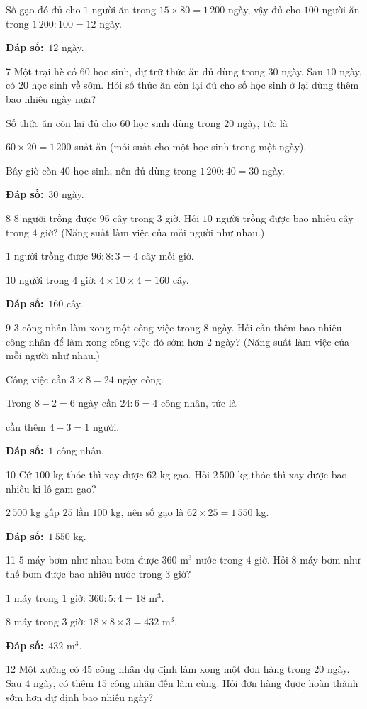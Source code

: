\documentclass[11pt]{article}
\newif\ifsol \solfalse
\providecommand{\AnsWord}{Đáp số}
\newcommand{\dapso}[1]{\par\textbf{\AnsWord:}\ #1}
\newcommand{\probsol}[1]{%
  \begin{lrbox}{\solmeasure}\begin{minipage}{\dimexpr\linewidth-24pt\relax}#1\end{minipage}\end{lrbox}%
  \ifsol
    \begin{solbox}#1\end{solbox}%
  \else
    \setlength{\solht}{\dimexpr\ht\solmeasure+\dp\solmeasure+0.85cm\relax}%
    \ifdim\solht<1.35cm\setlength{\solht}{1.35cm}\fi
    \begin{tcolorbox}[colback=white,colframe=Line,boxrule=0.8pt,arc=5pt,
      left=8pt,right=8pt,top=4pt,bottom=4pt,height=\solht]{\footnotesize\color{Slate}\itshape\WorkWord}\end{tcolorbox}%
  \fi}
\newcommand{\gap}{\vspace{0.3cm}}
\def\WorkWord{Bài làm:}
\def\AnsWord{Đáp số}
\begin{document}
\probsol{
Số gạo đó đủ cho $1$ người ăn trong $15\times80=1\,200$ ngày, vậy đủ cho $100$ người ăn trong $1\,200:100=12$ ngày.
\dapso{$12$ ngày.}}
\gap
\begin{probbox}{7}{\relax}
Một trại hè có $60$ học sinh, dự trữ thức ăn đủ dùng trong $30$ ngày. Sau $10$ ngày, có $20$ học sinh về sớm. Hỏi số thức ăn còn lại đủ cho số học sinh ở lại dùng thêm bao nhiêu ngày nữa?
\end{probbox}
\probsol{
Số thức ăn còn lại đủ cho $60$ học sinh dùng trong $20$ ngày, tức là\par $60\times20=1\,200$ suất ăn (mỗi suất cho một học sinh trong một ngày).\par Bây giờ còn $40$ học sinh, nên đủ dùng trong $1\,200:40=30$ ngày.
\dapso{$30$ ngày.}}
\gap
\begin{probbox}{8}{\relax}
$8$ người trồng được $96$ cây trong $3$ giờ. Hỏi $10$ người trồng được bao nhiêu cây trong $4$ giờ? (Năng suất làm việc của mỗi người như nhau.)
\end{probbox}
\probsol{
$1$ người trồng được $96:8:3=4$ cây mỗi giờ.\par $10$ người trong $4$ giờ: $4\times10\times4=160$ cây.
\dapso{$160$ cây.}}
\gap
\begin{probbox}{9}{\relax}
$3$ công nhân làm xong một công việc trong $8$ ngày. Hỏi cần thêm bao nhiêu công nhân để làm xong công việc đó sớm hơn $2$ ngày? (Năng suất làm việc của mỗi người như nhau.)
\end{probbox}
\probsol{
Công việc cần $3\times8=24$ ngày công.\par Trong $8-2=6$ ngày cần $24:6=4$ công nhân, tức là\par cần thêm $4-3=1$ người.
\dapso{$1$ công nhân.}}
\gap
\begin{probbox}{10}{\relax}
Cứ $100$ kg thóc thì xay được $62$ kg gạo. Hỏi $2\,500$ kg thóc thì xay được bao nhiêu ki-lô-gam gạo?
\end{probbox}
\probsol{
$2\,500$ kg gấp $25$ lần $100$ kg, nên số gạo là $62\times25=1\,550$ kg.
\dapso{$1\,550$ kg.}}
\gap
\begin{probbox}{11}{\relax}
$5$ máy bơm như nhau bơm được $360$ m$^3$ nước trong $4$ giờ. Hỏi $8$ máy bơm như thế bơm được bao nhiêu nước trong $3$ giờ?
\end{probbox}
\probsol{
$1$ máy trong $1$ giờ: $360:5:4=18$ m$^3$.\par $8$ máy trong $3$ giờ: $18\times8\times3=432$ m$^3$.
\dapso{$432$ m$^3$.}}
\gap
\begin{probbox}{12}{\relax}
Một xưởng có $45$ công nhân dự định làm xong một đơn hàng trong $20$ ngày. Sau $4$ ngày, có thêm $15$ công nhân đến làm cùng. Hỏi đơn hàng được hoàn thành sớm hơn dự định bao nhiêu ngày?
\end{probbox}
\end{document}
